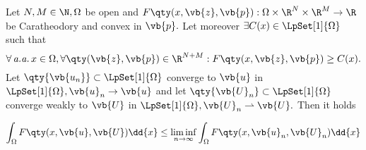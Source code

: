 \begin{theorem}
	Let $N, M \in \N, \Omega$ be open and $F\qty(x, \vb{z}, \vb{p}): \Omega \times \R^{N} \times \R^{M} \to \R$ be Caratheodory and convex in $\vb{p}.$ Let moreover $\exists C(x) \in \LpSet[1]{\Omega}$ such that
	\[
		\forall \, \text{\textit{a.a.}} \, x \in \Omega, \forall \qty(\vb{z}, \vb{p}) \in \R^{N+M}: F\qty(x, \vb{z}, \vb{p}) \geq C(x).
	\]
	Let $\qty{\vb{u_n}} \subset \LpSet[1]{\Omega}$ converge to $\vb{u}$ in $\LpSet[1]{\Omega}, \vb{u}_n \to \vb{u}$ and let $\qty{\vb{U}_n} \subset \LpSet[1]{\Omega}$ converge weakly to $\vb{U}$ in $\LpSet[1]{\Omega}, \vb{U}_n \rightharpoonup \vb{U}.$ Then it holds

	\[
		\int_{\Omega}F\qty(x, \vb{u}, \vb{U})\dd{x} \leq \liminf_{n\to \infty} \int_{\Omega}F\qty(x, \vb{u}_n, \vb{U}_n)\dd{x}
	\]
\end{theorem}

